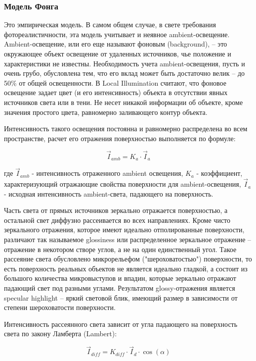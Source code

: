 \documentclass[12pt, a4paper]{article}
\begin{document}
\subsubsection{Модель Фонга}

Это эмпирическая модель. В самом общем случае, в свете требования фотореалистичности, эта модель учитывает и неявное ambient-освещение. Ambient-освещение, или его еще называют фоновым (background), – это окружающее объект освещение от удаленных источников, чье положение и характеристики не известны. Необходимость учета ambient-освещения, пусть и очень грубо, обусловлена тем, что его вклад может быть достаточно велик – до 50\% от общей освещенности. В Local Illumination считают, что фоновое освещение задает цвет (и его интенсивность) объекта в отсутствии явных источников света или в тени. Не несет никакой информации об объекте, кроме значения простого цвета, равномерно заливающего контур объекта.

Интенсивность такого освещения постоянна и равномерно распределена во всем пространстве, расчет его отражения поверхностью выполняется по формуле:

$$
 \vec{I}_{amb} = K_{a} \cdot \vec{I}_{a}
$$

где $\vec{I}_{amb}$  - интенсивность отраженного ambient освещения, $K_{a}$ - коэффициент, характеризующий отражающие свойства поверхности для  ambient-освещения, $\vec{I}_{a}$ - исходная интенсивность ambient-света, падающего на поверхность.

Часть света от прямых источников зеркально отражается поверхностью, а остальной свет диффузно рассеивается во всех направлениях. Кроме чисто зеркального отражения, которое имеют идеально отполированные поверхности, различают так называемое glossiness или распределенное зеркальное отражение – отражение в некотором створе углов, а не на один единственный угол. Такое рассеяние света обусловлено микрорельефом ("шероховатостью") поверхности, то есть поверхность реальных объектов не является идеально гладкой, а состоит из большого количества микровыступов и впадин, которые зеркально отражают падающий свет под разными углами. Результатом glossy-отражения является specular highlight – яркий световой блик, имеющий размер в зависимости от степени шероховатости поверхности. 

Интенсивность рассеянного света зависит от угла падающего на поверхность света по закону Ламберта (Lambert):

$$
 \vec{I}_{diff} = K_{diff} \cdot \vec{I}_{d} \cdot \cos(\alpha)
$$
 
\end{document}
